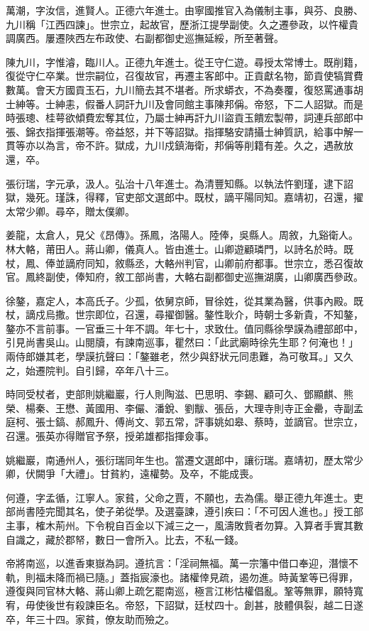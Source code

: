 \begin{pinyinscope}
萬潮，字汝信，進賢人。正德六年進士。由寧國推官入為儀制主事，與芬、良勝、九川稱「江西四諫」。世宗立，起故官，歷浙江提學副使。久之遷參政，以忤權貴調廣西。屢遷陜西左布政使、右副都御史巡撫延綏，所至著聲。

陳九川，字惟濬，臨川人。正德九年進士。從王守仁遊。尋授太常博士。既削籍，復從守仁卒業。世宗嗣位，召復故官，再遷主客郎中。正貢獻名物，節貢使犒賞費數萬。會天方國貢玉石，九川簡去其不堪者。所求蟒衣，不為奏覆，復怒罵通事胡士紳等。士紳恚，假番人詞訐九川及會同館主事陳邦偁。帝怒，下二人詔獄。而是時張璁、桂萼欲傾費宏奪其位，乃屬士紳再訐九川盜貢玉饋宏製帶，詞連兵部郎中張、錦衣指揮張潮等。帝益怒，并下等詔獄。指揮駱安請攝士紳質訊，給事中解一貫等亦以為言，帝不許。獄成，九川戍鎮海衛，邦偁等削籍有差。久之，遇赦放還，卒。

張衍瑞，字元承，汲人。弘治十八年進士。為清豐知縣。以執法忤劉瑾，逮下詔獄，幾死。瑾誅，得釋，官吏部文選郎中。既杖，謫平陽同知。嘉靖初，召還，擢太常少卿。尋卒，贈太僕卿。

姜龍，太倉人，見父《昂傳》。孫鳳，洛陽人。陸俸，吳縣人。周敘，九谿衛人。林大輅，莆田人。蔣山卿，儀真人。皆由進士。山卿遊顧璘門，以詩名於時。既杖，鳳、俸並謫府同知，敘縣丞，大輅州判官，山卿前府都事。世宗立，悉召復故官。鳳終副使，俸知府，敘工部尚書，大輅右副都御史巡撫湖廣，山卿廣西參政。

徐鏊，嘉定人，本高氏子。少孤，依舅京師，冒徐姓，從其業為醫，供事內殿。既杖，謫戍烏撒。世宗即位，召還，尋擢御醫。鏊性耿介，時朝士多新貴，不知鏊，鏊亦不言前事。一官垂三十年不調。年七十，求致仕。值同縣徐學謨為禮部郎中，引見尚書吳山。山閱牘，有諫南巡事，瞿然曰：「此武廟時徐先生耶？何淹也！」兩侍郎嫌其老，學謨抗聲曰：「鏊雖老，然少與舒狀元同患難，為可敬耳。」又久之，始遷院判。自引歸，卒年八十三。

時同受杖者，吏部則姚繼巖，行人則陶滋、巴思明、李錫、顧可久、鄧顯麒、熊榮、楊秦、王懋、黃國用、李儼、潘銳、劉黻、張岳，大理寺則寺正金罍，寺副孟庭柯、張士鎬、郝鳳升、傅尚文、郭五常，評事姚如皋、蔡時，並謫官。世宗立，召還。張英亦得贈官予祭，授弟雄都指揮僉事。

姚繼巖，南通州人，張衍瑞同年生也。當遷文選郎中，讓衍瑞。嘉靖初，歷太常少卿，伏闕爭「大禮」。甘貧約，遠權勢。及卒，不能成喪。

何遵，字孟循，江寧人。家貧，父命之賈，不願也，去為儒。舉正德九年進士。吏部尚書陸完聞其名，使子弟從學。及選臺諫，遵引疾曰：「不可因人進也。」授工部主事，榷木荊州。下令稅自百金以下減三之一，風濤敗貲者勿算。入算者手實其數自識之，藏於郡帑，數日一會所入。比去，不私一錢。

帝將南巡，以進香東嶽為詞。遵抗言：「淫祠無福。萬一宗籓中借口奉迎，潛懷不軌，則福未降而禍已隨。」蓋指宸濠也。諸權倖見疏，遏勿進。時黃鞏等已得罪，遵復與同官林大輅、蔣山卿上疏乞罷南巡，極言江彬怙權倡亂。鞏等無罪，願特寬宥，毋使後世有殺諫臣名。帝怒，下詔獄，廷杖四十。創甚，肢體俱裂，越二日遂卒，年三十四。家貧，僚友助而殮之。


\end{pinyinscope}
